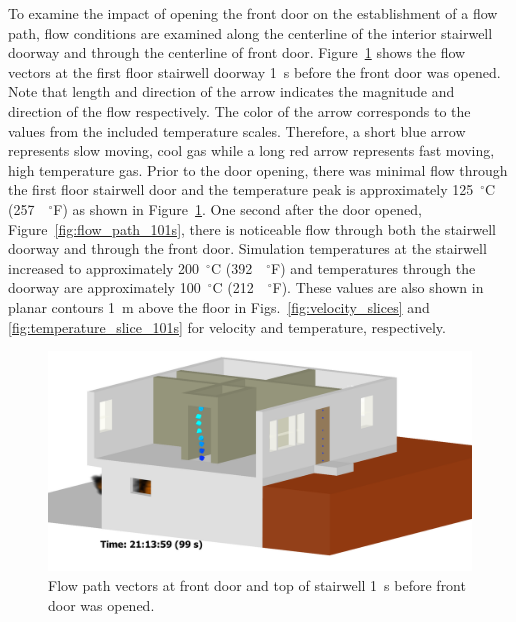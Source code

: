 \documentclass[12pt,oneside]{book}
\begin{document}
To examine the impact of opening the front door on the establishment of a flow path, flow conditions are examined along the centerline of the interior stairwell doorway and through the centerline of front door. Figure~\ref{fig:flow_path_99s} shows the flow vectors at the first floor stairwell doorway 1~s before the front door was opened. Note that length and direction of the arrow indicates the magnitude and direction of the flow respectively. The color of the arrow corresponds to the values from the included temperature scales. Therefore, a short blue arrow represents slow moving, cool gas while a long red arrow represents fast moving, high temperature gas. Prior to the door opening, there was minimal flow through the first floor stairwell door and the temperature peak is approximately 125~$^{\circ}$C (257~~$^{\circ}$F) as shown in Figure~\ref{fig:flow_path_99s}. One second after the door opened, Figure~\ref{fig:flow_path_101s}, there is noticeable flow through both the stairwell doorway and through the front door. Simulation temperatures at the stairwell increased to approximately 200~$^{\circ}$C (392~~$^{\circ}$F) and temperatures through the doorway are approximately 100~$^{\circ}$C (212~~$^{\circ}$F). These values are also shown in planar contours 1~m above the floor in Figs.~\ref{fig:velocity_slices} and \ref{fig:temperature_slice_101s} for velocity and temperature, respectively.

\begin{figure}[!ht]
\includegraphics[trim = 2.5in 0in 4in 0in, clip=true, width=.65\textwidth]{../Figures/flow_vector_99s}


\caption[Flow path vectors at front door and top of stairwell 1~s before front door was opened]
{Flow path vectors at front door and top of stairwell 1~s before front door was opened.}
\label{fig:flow_path_99s}
\end{figure}
\end{document}
